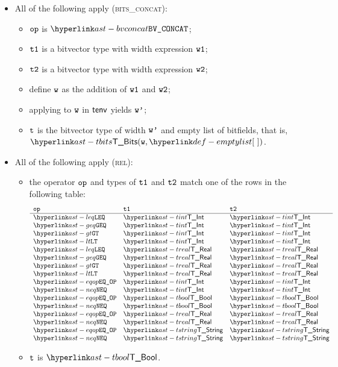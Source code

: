 \begin{itemize}
  \item All of the following apply (\textsc{bits\_concat}):
  \begin{itemize}
    \item $\texttt{op}$ is $\BVCONCAT$;
    \item $\texttt{t1}$ is a bitvector type with width expression $\texttt{w1}$;
    \item $\texttt{t2}$ is a bitvector type with width expression $\texttt{w2}$;
    \item define $\texttt{w}$ as the addition of $\texttt{w1}$ and $\texttt{w2}$;
    \item applying \normalize{} to $\texttt{w}$ in $\textsf{tenv}$ yields $\texttt{w'}$;
    \item $\texttt{t}$ is the bitvector type of width $\texttt{w'}$ and empty list of bitfields, that is, \\ $\TBits(\vw, \emptylist)$.
  \end{itemize}

  \item All of the following apply (\textsc{rel}):
  \begin{itemize}
    \item the operator $\texttt{op}$ and types of $\texttt{t1}$ and $\texttt{t2}$ match one of the rows in the following table:
    \[
    \begin{array}{lll}
      \mathbf{\op} & \mathbf{\vtone} & \mathbf{\vttwo} \\
      \hline
      \LEQ  & \TInt    & \TInt\\
      \GEQ  & \TInt    & \TInt\\
      \GT   & \TInt    & \TInt\\
      \LT   & \TInt    & \TInt\\
      \LEQ  & \TReal   & \TReal\\
      \GEQ  & \TReal   & \TReal\\
      \GT   & \TReal   & \TReal\\
      \LT   & \TReal   & \TReal\\
      \EQOP & \TInt    & \TInt\\
      \NEQ  & \TInt    & \TInt\\
      \EQOP & \TBool   & \TBool\\
      \NEQ  & \TBool   & \TBool\\
      \EQOP & \TReal   & \TReal\\
      \NEQ  & \TReal   & \TReal\\
      \EQOP & \TString & \TString\\
      \NEQ  & \TString & \TString
    \end{array}
    \]
    \item $\texttt{t}$ is $\TBool$.
  \end{itemize}


\end{itemize}
